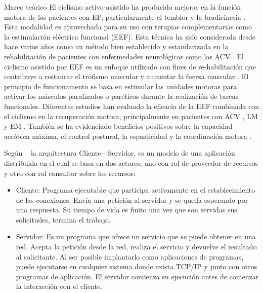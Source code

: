 \begin{thesischapter}{1} {Marco teórico}
    \vspace{5pt}
    El ciclismo activo-asistido ha producido mejoras en la función motora de los pacientes con EP, particularmente el temblor y la bradicinesia \cite{ryan2020interval, palomino2021efectividad}. Esta modalidad es aprovechada para su uso con terapias complementarias como la estimulación eléctrica funcional (EEF). Esta técnica ha sido considerada desde hace varios años como un método bien establecido y estandarizada en la rehabilitación de pacientes con enfermedades neurológicas como las ACV \cite{rabelo2018overview}. El ciclismo asistido por EEF es un enfoque utilizado con fines de re-habilitación que contribuye a restaurar el trofismo muscular y aumentar la fuerza muscular \cite{barbosa2015application, ferrante2008cycling}. El principio de funcionamento se basa en estimular las unidades motoras para activar los músculos paralizados o paréticos durante la realización de tareas funcionales. Diferentes estudios han evaluado la eficacia de la EEF combinada con el ciclismo en la recuperación motora, principalmente en pacientes con ACV \cite{ambrosini2020does}, LM \cite{casabona2020effects} y EM \cite{pilutti2019functional}. También se ha evidenciado beneficios positivos sobre la capacidad aeróbica máxima, el control postural, la espasticidad y la coordinación motora \cite{barbosa2015application, rabelo2018overview}.

    \vspace{10pt}
    Según ~\cite{moyano2020arquitectura} la arquitectura Cliente - Servidor, es un modelo de una aplicación distribuida en el cual se basa en dos actores, uno con rol de proveedor de recursos y otro con rol consultor sobre los recursos:
    
    \begin{itemize}
        \item Cliente: Programa ejecutable que participa activamente en el establecimiento de las conexiones. Envía una petición al servidor y se queda esperando por una respuesta. Su tiempo de vida es finito una vez que son servidas sus solicitudes, termina el trabajo.
        \item Servidor: Es un programa que ofrece un servicio que se puede obtener en una red. Acepta la petición desde la red, realiza el servicio y devuelve el resultado al solicitante. Al ser posible implantarlo como aplicaciones de programas, puede ejecutarse en cualquier sistema donde exista TCP/IP y junto con otros programas de aplicación. El servidor comienza su ejecución antes de comenzar la interacción con el cliente.
    \end{itemize}


\end{thesischapter}
